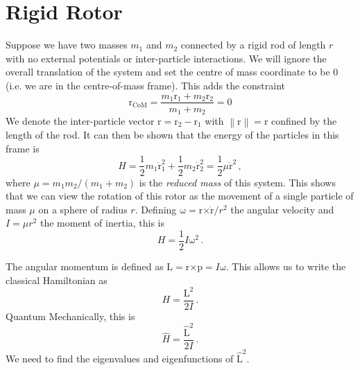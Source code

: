 \documentclass{article}
\theoremstyle{plain}\theoremheaderfont{\normalfont\itshape}\theorembodyfont{\rmfamily}\theoremseparator{.}\newtheorem*{rem}{Remark}\newtheorem*{ex}{Example}\newtheorem*{proof}{Proof}\newtheorem*{altp}{Alternative proof}
\theoremstyle{plain}\theoremheaderfont{\normalfont\bfseries}\theorembodyfont{\rmfamily}\theoremseparator{.}\newtheorem{thm}{Theorem}[section]\newtheorem{lem}[thm]{Lemma}\newtheorem{prop}[thm]{Proposition}\newtheorem*{cor}{Corollary}\newtheorem{defn}[thm]{Definition}\newtheorem{clm}[thm]{Claim}\newtheorem{clminproof}{Claim}
\theoremstyle{break}\theoremheaderfont{\normalfont\itshape}\theorembodyfont{\rmfamily}\theoremseparator{.\medskip}\newtheorem*{proofskip}{Proof}\newtheorem*{exs}{Examples}\newtheorem*{rems}{Remarks}
\theoremstyle{break}\theoremheaderfont{\normalfont\bfseries}\theorembodyfont{\rmfamily}\theoremseparator{.\medskip}\newtheorem{lemskip}[thm]{Lemma}\newtheorem{defnskip}[thm]{Definition}\newtheorem{propskip}[thm]{Proposition}\newtheorem{thmskip}[thm]{Theorem}
\numberwithin{equation}{section}
\newcommand{\vb}[1]{\bm{\mathrm{#1}}}
\newcommand{\cross}{\bm{\times}}
\newcommand{\norm}[1]{\left\| #1 \right\|}
\begin{document}
    \section{Rigid Rotor}
    Suppose we have two masses \(m_1\) and \(m_2\) connected by a rigid rod of length \(r\) with no external potentials or inter-particle interactions. We will ignore the overall translation of the system and set the centre of mass coordinate to be \(\vb{0}\) (i.e. we are in the centre-of-mass frame). This adds the constraint
    \begin{equation}
        \vb{r}_{\text{CoM}}=\frac{m_1\vb{r}_1+m_2\vb{r}_2}{m_1+m_2}=\vb{0}
    \end{equation}
    We denote the inter-particle vector \(\vb{r}=\vb{r}_2-\vb{r}_1\) with \(\norm{\vb{r}}=\vb{r}\) confined by the length of the rod. It can then be shown that the energy of the particles in this frame is
    \begin{equation}
        H=\frac{1}{2}m_1\dot{\vb{r}}_1^2+\frac{1}{2}m_2\dot{\vb{r}}_2^2=\frac{1}{2}\mu\dot{\vb{r}}^2\,,
    \end{equation}
    where \(\mu=m_1m_2/(m_1+m_2)\) is the \textit{reduced mass} of this system. This shows that we can view the rotation of this rotor as the movement of a single particle of mass \(\mu\) on a sphere of radius \(r\). Defining \(\vb{\omega}=\vb{r}\cross\dot{\vb{r}}/r^2\) the angular velocity and \(I=\mu r^2\) the moment of inertia, this is
    \begin{equation}
        H=\frac{1}{2}I\vb{\omega}^2\,.
    \end{equation} 

    The angular momentum is defined as \(\vb{L}=\vb{r}\cross\vb{p}=I\vb{\omega}\). This allows us to write the classical Hamiltonian as
    \begin{equation}
        H=\frac{\vb{L}^2}{2I}\,.
    \end{equation}
    Quantum Mechanically, this is
    \begin{equation}
        \hat{H}=\frac{\hat{\vb{L}}^2}{2I}\,.
    \end{equation}
    We need to find the eigenvalues and eigenfunctions of \(\hat{\vb{L}}^2\).
\end{document}

